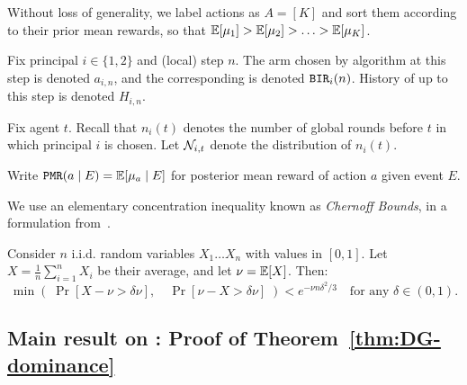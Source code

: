 
 Without loss of generality, we label actions as $A=[K]$ and sort them according to their prior mean rewards, so that
    $ \E[\mu_1] > \E[\mu_2] > \ldots > \E[\mu_K]$.

Fix principal $i\in \{1,2\}$ and (local) step $n$. The arm chosen by algorithm \alg[i] at this step is denoted $a_{i,n}$, and the corresponding \BIR is denoted $\mathtt{BIR}_i(n)$. History of \alg[i] up to this step is denoted $H_{i,n}$.

Fix agent $t$. Recall that $n_i(t)$ denotes the number of global rounds before $t$ in which principal $i$ is chosen. Let $\mathcal{N}_{i,t}$ denote the distribution of $n_i(t)$.

Write
    $\PMR(a\mid E) = \E[\mu_a \mid E]$
for posterior mean reward of action $a$ given event $E$.

We use an elementary concentration inequality known as {\em Chernoff Bounds}, in a formulation from~\cite{MitzUpfal-book05}.
\begin{theorem}
\label{thm:chernoff}
Consider $n$ i.i.d. random variables $X_1 \ldots X_n$ with values in $[0,1]$. Let
    $X = \tfrac{1}{n} \sum_{i=1}^n X_i$ be their average, and let $\nu = \E[X]$. Then:
\[ \min\left(\; \Pr[ X-\nu > \delta \nu ],\quad
                \Pr[ \nu-X > \delta \nu ]
    \; \right)
    < e^{-\nu n \delta^2/3}
    \quad \text{for any $\delta\in (0,1)$.}
\]
\end{theorem}






\subsection{Main result on \HardMax: Proof of Theorem~\ref{thm:DG-dominance}}
\label{sec:proofs-HM-main}


